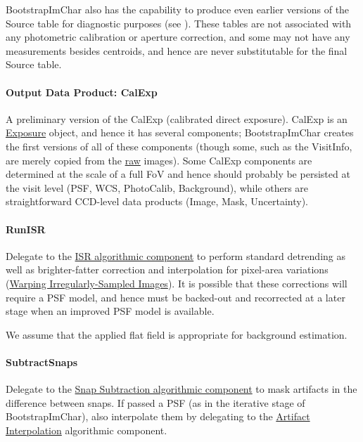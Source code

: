 BootstrapImChar also has the capability to produce even earlier versions of the Source table for diagnostic purposes (see ).  These tables are not associated with any photometric calibration or aperture correction, and some may not have any measurements besides centroids, and hence are never substitutable for the final Source table.

\paragraph{Output Data Product: CalExp}
\label{sec:drpBootstrapImChar_calexp}

A preliminary version of the CalExp (calibrated direct exposure).  CalExp is an \hyperref[sec:spImagesExposure]{Exposure} object, and hence it has several components; BootstrapImChar creates the first versions of all of these components (though some, such as the VisitInfo, are merely copied from the \hyperref[sec:drpBootstrapImChar_raw]{raw} images).  Some CalExp components are determined at the scale of a full FoV and hence should probably be persisted at the visit level (PSF, WCS, PhotoCalib, Background), while others are straightforward CCD-level data products (Image, Mask, Uncertainty).

\paragraph{RunISR}
\label{sec:drpBootstrapImChar_RunISR}

Delegate to the \hyperref[sec:acISR]{ISR algorithmic component} to perform standard detrending as well as brighter-fatter correction and interpolation for pixel-area variations (\hyperref[sec:acFixPixelAreaVariations]{Warping Irregularly-Sampled Images}).  It is possible that these corrections will require a PSF model, and hence must be backed-out and recorrected at a later stage when an improved PSF model is available.

We assume that the applied flat field is appropriate for background estimation.

\paragraph{SubtractSnaps}
\label{sec:drpBootstrapImChar_SubtractSnaps}

Delegate to the \hyperref[sec:acSnapSubtraction]{Snap Subtraction algorithmic component} to mask artifacts in the difference between snaps.  If passed a PSF (as in the iterative stage of BootstrapImChar), also interpolate them by delegating to the \hyperref[sec:acArtifactInterpolation]{Artifact Interpolation} algorithmic component.

